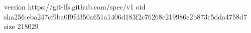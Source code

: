 version https://git-lfs.github.com/spec/v1
oid sha256:eba247cf9ba0f9fd350a651a1406d183f2c76268c219986e2b873c5dda4758d7
size 218029
